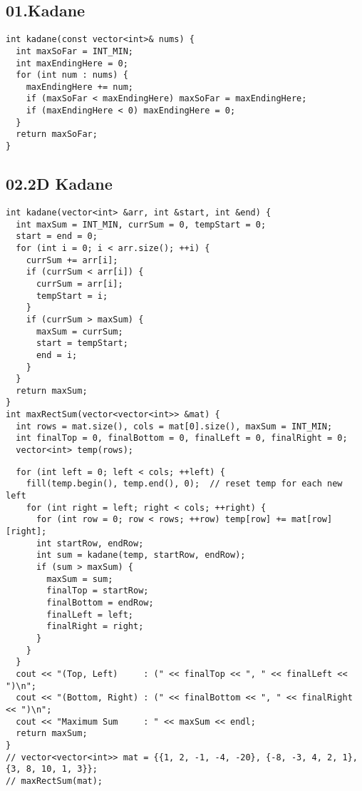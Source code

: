 \documentclass[twoside]{article}
\begin{document}
\begin{multicols*}{2}
{\subsection*{01.Kadane}
}
\begin{verbatim}
int kadane(const vector<int>& nums) {
  int maxSoFar = INT_MIN;
  int maxEndingHere = 0;
  for (int num : nums) {
    maxEndingHere += num;
    if (maxSoFar < maxEndingHere) maxSoFar = maxEndingHere;
    if (maxEndingHere < 0) maxEndingHere = 0;
  }
  return maxSoFar;
}
\end{verbatim}

{
\subsection*{02.2D Kadane}
}
\begin{verbatim}
int kadane(vector<int> &arr, int &start, int &end) {
  int maxSum = INT_MIN, currSum = 0, tempStart = 0;
  start = end = 0;
  for (int i = 0; i < arr.size(); ++i) {
    currSum += arr[i];
    if (currSum < arr[i]) {
      currSum = arr[i];
      tempStart = i;
    }
    if (currSum > maxSum) {
      maxSum = currSum;
      start = tempStart;
      end = i;
    }
  }
  return maxSum;
}
int maxRectSum(vector<vector<int>> &mat) {
  int rows = mat.size(), cols = mat[0].size(), maxSum = INT_MIN;
  int finalTop = 0, finalBottom = 0, finalLeft = 0, finalRight = 0;
  vector<int> temp(rows);
\end{verbatim}
\vspace{-12pt}
\begin{verbatim}
  for (int left = 0; left < cols; ++left) {
    fill(temp.begin(), temp.end(), 0);  // reset temp for each new left
    for (int right = left; right < cols; ++right) {
      for (int row = 0; row < rows; ++row) temp[row] += mat[row][right];
      int startRow, endRow;
      int sum = kadane(temp, startRow, endRow);
      if (sum > maxSum) {
        maxSum = sum;
        finalTop = startRow;
        finalBottom = endRow;
        finalLeft = left;
        finalRight = right;
      }
    }
  }
  cout << "(Top, Left)     : (" << finalTop << ", " << finalLeft << ")\n";
  cout << "(Bottom, Right) : (" << finalBottom << ", " << finalRight << ")\n";
  cout << "Maximum Sum     : " << maxSum << endl;
  return maxSum;
}
// vector<vector<int>> mat = {{1, 2, -1, -4, -20}, {-8, -3, 4, 2, 1}, {3, 8, 10, 1, 3}};
// maxRectSum(mat);


\end{verbatim}
\end{multicols*}
\end{document}
